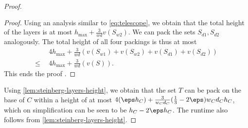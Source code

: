 \begin{proof}
\begin{proof}
    Using an analysis similar to \cref{eq:telescope}, we obtain that the total height of the layers is at most $h_{\max}+\frac{3}{wd}v(S_{w2})$. We can pack the sets $S_{d1},S_{d2}$ analogously. The total height of
    all four packings is thus at most
    \begin{align*}
        &4h_{\max}+\frac{3}{wd}(v(S_{w1})+v(S_{w2})+v(S_{d1})+v(S_{d2}))\\
       \le\:\:&4h_{\max}+\frac{3}{wd}(v(S)).
    \end{align*}
    This ends the proof .
\end{proof}

Using \cref{lem:steinberg-layers-height}, we obtain that the set $T$ can be pack on the base of $C$ within a height of at most $4(\eps h_C)+\frac{3}{w_Cd_C}(\frac13-2\eps)w_Cd_Ch_C$,
which on simplification can be seen to be $h_C-2\eps h_C$. The runtime also follows from \cref{lem:steinberg-layers-height}.
\end{proof}






